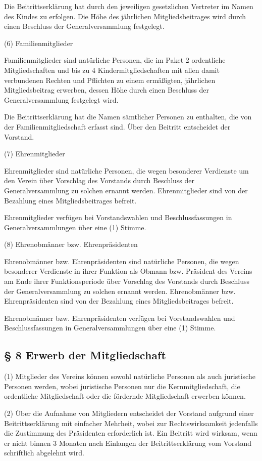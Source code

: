 \documentclass[11pt,a4paper]{article}
\begin{document}
Die Beitrittserklärung hat durch den jeweiligen gesetzlichen Vertreter im Namen des Kindes zu erfolgen.
Die Höhe des jährlichen Mitgliedsbeitrages wird durch einen Beschluss der Generalversammlung festgelegt.

(6)
Familienmitglieder

Familienmitglieder sind natürliche Personen, die im Paket 2 ordentliche Mitgliedschaften und bis zu 4 Kindermitgliedschaften mit allen damit verbundenen Rechten und Pflichten zu einem ermäßigten, jährlichen Mitgliedsbeitrag erwerben, dessen Höhe durch einen Beschluss der Generalversammlung festgelegt wird.

Die Beitrittserklärung hat die Namen sämtlicher Personen zu enthalten, die von der Familienmitgliedschaft erfasst sind.
Über den Beitritt entscheidet der Vorstand.

(7)
Ehrenmitglieder

Ehrenmitglieder sind natürliche Personen, die wegen besonderer Verdienste um den Verein über Vorschlag des Vorstands durch Beschluss der Generalversammlung zu solchen ernannt werden.
Ehrenmitglieder sind von der Bezahlung eines Mitgliedsbeitrages befreit.

Ehrenmitglieder verfügen bei Vorstandswahlen und Beschlussfassungen in Generalversammlungen über eine (1) Stimme.

(8)
Ehrenobmänner bzw. Ehrenpräsidenten

Ehrenobmänner bzw. Ehrenpräsidenten sind natürliche Personen, die wegen besonderer Verdienste in ihrer Funktion als Obmann bzw. Präsident des Vereins am Ende ihrer Funktionsperiode über Vorschlag des Vorstands durch Beschluss der Generalversammlung zu solchen ernannt werden.
Ehrenobmänner bzw. Ehrenpräsidenten sind von der Bezahlung eines Mitgliedsbeitrages befreit.

Ehrenobmänner bzw. Ehrenpräsidenten verfügen bei Vorstandswahlen und Beschlussfassungen in Generalversammlungen über eine (1) Stimme.

\subsection{§ 8
Erwerb der Mitgliedschaft}

(1)
Mitglieder des Vereins können sowohl natürliche Personen als auch juristische Personen werden, wobei juristische Personen nur die Kernmitgliedschaft, die ordentliche Mitgliedschaft oder die fördernde Mitgliedschaft erwerben können.

(2)
Über die Aufnahme von Mitgliedern entscheidet der Vorstand aufgrund einer Beitrittserklärung mit einfacher Mehrheit, wobei zur Rechtswirksamkeit jedenfalls die Zustimmung des Präsidenten erforderlich ist.
Ein Beitritt wird wirksam, wenn er nicht binnen 3 Monaten nach Einlangen der Beitrittserklärung vom Vorstand schriftlich abgelehnt wird.
\end{document}
